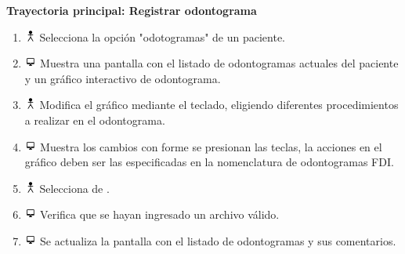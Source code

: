 \textbf{Trayectoria principal: Registrar odontograma}  
\begin{enumerate}
\item \includegraphics[height=1em]{pictures/actor.png} Selecciona la opción "odotogramas" de un paciente.
\item \includegraphics[height=1em]{pictures/sistema.png} Muestra una pantalla con el listado de odontogramas actuales del paciente y un gráfico interactivo de odontograma.
\item \includegraphics[height=1em]{pictures/actor.png} Modifica el gráfico mediante el teclado, eligiendo diferentes procedimientos a realizar en el odontograma.
\item \includegraphics[height=1em]{pictures/sistema.png} Muestra los cambios con forme se presionan las teclas, la acciones en el gráfico deben ser las especificadas en la nomenclatura de odontogramas FDI.
\item \includegraphics[height=1em]{pictures/actor.png} Selecciona de .
\item \includegraphics[height=1em]{pictures/sistema.png} Verifica que se hayan ingresado un archivo válido.
\item \includegraphics[height=1em]{pictures/sistema.png} Se actualiza la pantalla con el listado de odontogramas y sus comentarios.
\end{enumerate} \bigskip

